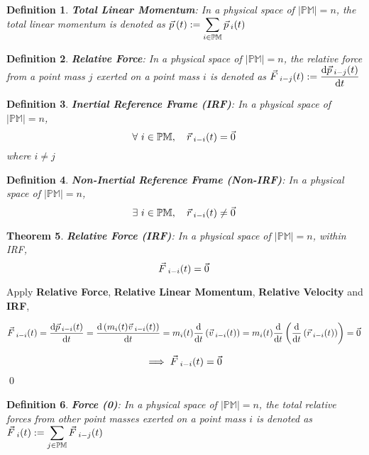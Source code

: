 \documentclass[12pt]{amsart}
\newtheorem{theorem}{Theorem}[section]
\newtheorem{definition}[theorem]{Definition}
\renewenvironment{proof}{{\bfseries Proof.}}{\qed}
\let\oldvec\vec
\renewcommand{\vec}[1]{\oldvec{#1}\hspace{0.1em}}
\begin{document}
\begin{definition}
\textbf{Total Linear Momentum}: In a physical space of $\left | \mathbb{PM} \right | = n$, the total linear momentum is denoted as $\vec{p}(t) := \displaystyle \sum_{i \in \mathbb{PM}} \vec{p}_{i} (t)$ 
\end{definition}

\begin{definition}
\textbf{Relative Force}: In a physical space of $\left | \mathbb{PM} \right | = n$, the relative force from a point mass $j$ exerted on a point mass $i$ is denoted as $  \vec{F}_{i-j}(t) := \dfrac{\mathrm{d} \vec{p}_{i-j} (t)}{\mathrm{d} t} $
\end{definition}

\begin{definition}
\textbf{Inertial Reference Frame (IRF)}: In a physical space of $\left | \mathbb{PM} \right | = n$, $$  \forall \  i \in \mathbb{PM}, \quad \vec{r}_{i-i}(t)=\vec{0} $$
where $i\ne j$
\end{definition}

\begin{definition}
\textbf{Non-Inertial Reference Frame (Non-IRF)}: In a physical space of $\left | \mathbb{PM} \right | = n$,$$\exists \  i \in \mathbb{PM}, \quad \vec{r}_{i-i} (t)\ne \vec{0} $$
\end{definition}

\begin{theorem}
 \textbf{Relative Force (IRF)}: In a physical space of $\left | \mathbb{PM} \right | = n$, within IRF, $$ \vec{F}_{i-i}(t) = \vec{0} $$
\end{theorem}

\begin{proof}
Apply \textbf{Relative Force}, \textbf{Relative Linear Momentum}, \textbf{Relative Velocity} and \textbf{IRF},

$$ \vec{F}_{i-i}(t) = \dfrac{\mathrm{d} \vec{p}_{i-i} (t)}{\mathrm{d} t} =  \dfrac{\mathrm{d} \left ( m_i (t)\vec{v}_{i-i} (t) \right )}{\mathrm{d} t} = m_i(t) \dfrac{\mathrm{d} }{\mathrm{d} t} \left ( \vec{v}_{i-i}(t) \right ) = m_i(t) \dfrac{\mathrm{d} }{\mathrm{d} t} \left ( \dfrac{\mathrm{d} }{\mathrm{d} t}  \left ( \vec{r}_{i-i}(t) \right ) \right ) = \vec{0}$$

$$ \implies \vec{F}_{i-i}(t) = \vec{0} $$
\end{proof}

\begin{definition}
\textbf{Force (0)}: In a physical space of $\left | \mathbb{PM} \right | = n$, the total relative forces from other point masses exerted on a point mass $i$ is denoted as $\vec{F}_{i}(t):= \displaystyle \sum_{j \in \mathbb{PM}} \vec{F}_{i-j}(t) $
\end{definition}
\end{document}
